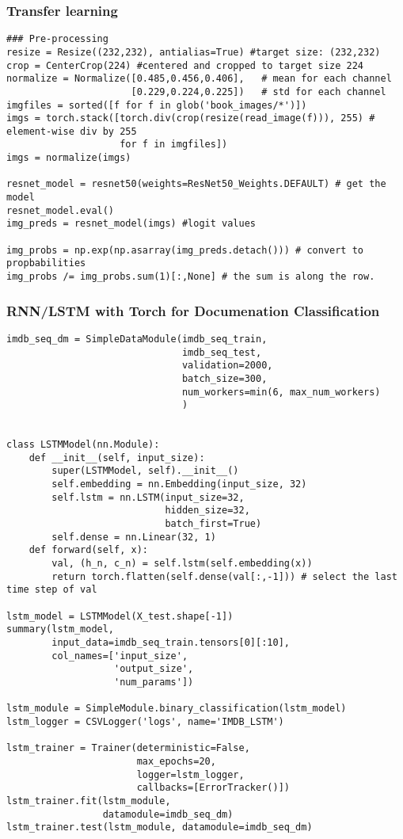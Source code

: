 \documentclass[
  letterpaper,
  DIV=11,
  numbers=noendperiod]{scrreprt}
\begin{document}
\subsubsection{Transfer learning}\label{transfer-learning}

\begin{verbatim}
### Pre-processing
resize = Resize((232,232), antialias=True) #target size: (232,232)
crop = CenterCrop(224) #centered and cropped to target size 224
normalize = Normalize([0.485,0.456,0.406],   # mean for each channel
                      [0.229,0.224,0.225])   # std for each channel
imgfiles = sorted([f for f in glob('book_images/*')])
imgs = torch.stack([torch.div(crop(resize(read_image(f))), 255) # element-wise div by 255
                    for f in imgfiles])
imgs = normalize(imgs)

resnet_model = resnet50(weights=ResNet50_Weights.DEFAULT) # get the model
resnet_model.eval()
img_preds = resnet_model(imgs) #logit values

img_probs = np.exp(np.asarray(img_preds.detach())) # convert to propbabilities 
img_probs /= img_probs.sum(1)[:,None] # the sum is along the row. 

\end{verbatim}

\subsubsection{RNN/LSTM with Torch for Documenation
Classification}\label{rnnlstm-with-torch-for-documenation-classification}

\begin{verbatim}
imdb_seq_dm = SimpleDataModule(imdb_seq_train,
                               imdb_seq_test,
                               validation=2000,
                               batch_size=300,
                               num_workers=min(6, max_num_workers)
                               )


class LSTMModel(nn.Module):
    def __init__(self, input_size):
        super(LSTMModel, self).__init__()
        self.embedding = nn.Embedding(input_size, 32)
        self.lstm = nn.LSTM(input_size=32,
                            hidden_size=32,
                            batch_first=True)
        self.dense = nn.Linear(32, 1)
    def forward(self, x):
        val, (h_n, c_n) = self.lstm(self.embedding(x))
        return torch.flatten(self.dense(val[:,-1])) # select the last time step of val

lstm_model = LSTMModel(X_test.shape[-1])
summary(lstm_model,
        input_data=imdb_seq_train.tensors[0][:10],
        col_names=['input_size',
                   'output_size',
                   'num_params'])
        
lstm_module = SimpleModule.binary_classification(lstm_model)
lstm_logger = CSVLogger('logs', name='IMDB_LSTM')

lstm_trainer = Trainer(deterministic=False,
                       max_epochs=20,
                       logger=lstm_logger,
                       callbacks=[ErrorTracker()])
lstm_trainer.fit(lstm_module,
                 datamodule=imdb_seq_dm)
lstm_trainer.test(lstm_module, datamodule=imdb_seq_dm)
\end{verbatim}
\end{document}
